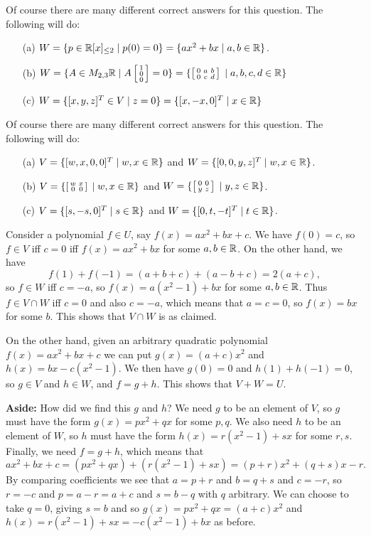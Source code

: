  Of course there are many different correct answers for this
 question.  The following will do:
 \begin{itemize}
  \item[(a)]
   $W=\{p\in {\mathbb{R}}[x]_{\leq 2}\;|\; p(0)=0\}=\{ax^2+bx\;|\; a,b\in{\mathbb{R}}\}$.
  \item[(b)]
   $W=\{A\in M_{2,3}{\mathbb{R}}\;|\; A\left[\begin{smallmatrix} 1\\0\\0\end{smallmatrix}\right] = 0\}=
     \{\left[\begin{smallmatrix} 0&a&b\\ 0&c&d\end{smallmatrix}\right] \;|\; a,b,c,d\in{\mathbb{R}}\}$
  \item[(c)]
   $W=\{[x,y,z]^T\in V\;|\; z=0\}=\{[x,-x,0]^T\;|\; x\in{\mathbb{R}}\}$
 \end{itemize}
\EndDeferredSolution

 Of course there are many different correct answers for this
 question.  The following will do:
 \begin{itemize}
  \item[(a)]
   $V=\{[w,x,0,0]^T\;|\; w,x\in{\mathbb{R}}\}$ and
   $W=\{[0,0,y,z]^T\;|\; w,x\in{\mathbb{R}}\}$.
  \item[(b)]
   $V=\{\left[\begin{smallmatrix} w&x\\0&0\end{smallmatrix}\right]\;|\; w,x\in{\mathbb{R}}\}$ and
   $W=\{\left[\begin{smallmatrix} 0&0\\y&z\end{smallmatrix}\right]\;|\; y,z\in{\mathbb{R}}\}$.
  \item[(c)]
   $V=\{[s,-s,0]^T\;|\; s\in{\mathbb{R}}\}$ and
   $W=\{[0,t,-t]^T\;|\; t\in{\mathbb{R}}\}$.
 \end{itemize}
\EndDeferredSolution

 Consider a polynomial $f\in U$, say $f(x)=ax^2+bx+c$.  We
 have $f(0)=c$, so $f\in V$ iff $c=0$ iff $f(x)=ax^2+bx$ for
 some $a,b\in{\mathbb{R}}$.  On the other hand, we have
 \[ f(1) + f(-1) = (a+b+c) + (a-b+c) = 2(a+c), \]
 so $f\in W$ iff $c=-a$, so $f(x)=a(x^2-1)+bx$ for some
 $a,b\in{\mathbb{R}}$.  Thus $f\in V\cap W$ iff $c=0$ and also $c=-a$,
 which means that $a=c=0$, so $f(x)=bx$ for some $b$.  This
 shows that $V\cap W$ is as claimed.

 On the other hand, given an arbitrary quadratic polynomial
 $f(x)=ax^2+bx+c$ we can put $g(x)=(a+c)x^2$ and
 $h(x)=bx-c(x^2-1)$.  We then have $g(0)=0$ and
 $h(1)+h(-1)=0$, so $g\in V$ and $h\in W$, and $f=g+h$.
 This shows that $V+W=U$.

 \textbf{Aside:}
 How did we find this $g$ and $h$?  We need $g$ to be an element of
 $V$, so $g$ must have the form $g(x)=px^2+qx$ for some $p,q$.  We
 also need $h$ to be an element of $W$, so $h$ must have the form
 $h(x)=r(x^2-1)+sx$ for some $r,s$.  Finally, we need $f=g+h$, which
 means that
 \[ ax^2+bx+c = (px^2+qx)+(r(x^2-1)+sx)
     = (p+r)x^2 + (q+s)x - r.
 \]
 By comparing coefficients we see that $a=p+r$ and $b=q+s$ and $c=-r$,
 so $r=-c$ and $p=a-r=a+c$ and $s=b-q$ with $q$ arbitrary.  We can
 choose to take $q=0$, giving $s=b$ and so $g(x)=px^2+qx=(a+c)x^2$ and
 $h(x)=r(x^2-1)+sx=-c(x^2-1)+bx$ as before.
\EndDeferredSolution

